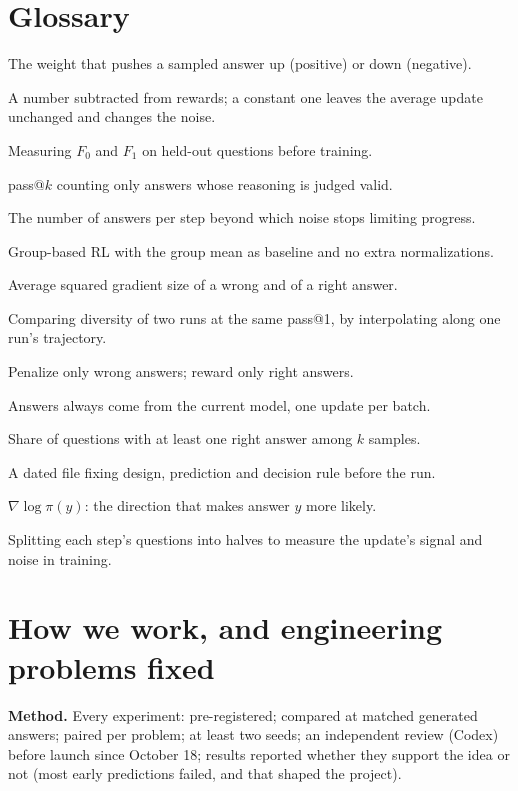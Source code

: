\documentclass[11pt]{article}
\begin{document}
\section{Glossary}
\begin{description}[leftmargin=*,itemsep=1pt,font=\normalfont\bfseries]
\item[Advantage] The weight that pushes a sampled answer up (positive) or down (negative).
\item[Baseline] A number subtracted from rewards; a constant one leaves the average update unchanged and changes the noise.
\item[Calibration] Measuring $F_0$ and $F_1$ on held-out questions before training.
\item[CoT-Pass@$k$] pass@$k$ counting only answers whose reasoning is judged valid.
\item[Critical budget / noise scale] The number of answers per step beyond which noise stops limiting progress.
\item[Dr.\ GRPO] Group-based RL with the group mean as baseline and no extra normalizations.
\item[$F_0$, $F_1$] Average squared gradient size of a wrong and of a right answer.
\item[Matched accuracy] Comparing diversity of two runs at the same pass@1, by interpolating along one run's trajectory.
\item[NSR, PSR] Penalize only wrong answers; reward only right answers.
\item[On-policy] Answers always come from the current model, one update per batch.
\item[pass@$k$] Share of questions with at least one right answer among $k$ samples.
\item[Pre-registration] A dated file fixing design, prediction and decision rule before the run.
\item[Score] $\nabla\log\pi(y)$: the direction that makes answer $y$ more likely.
\item[Split-half diagnostics] Splitting each step's questions into halves to measure the update's signal and noise in training.
\end{description}

\section{How we work, and engineering problems fixed}
\textbf{Method.} Every experiment: pre-registered; compared at matched generated answers; paired per problem; at least two seeds; an independent review (Codex) before launch since October 18; results reported whether they support the idea or not (most early predictions failed, and that shaped the project).
\end{document}
